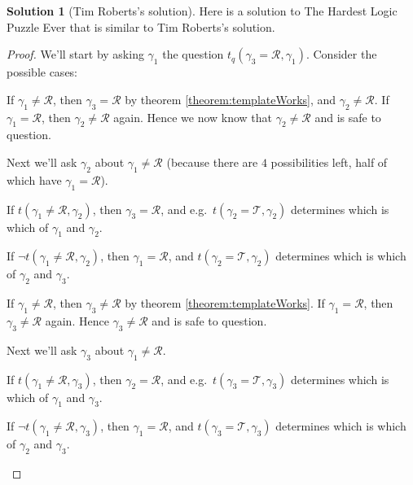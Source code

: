 \documentclass[twoside,twocolumn,a4paper,11pt]{article}
\theoremstyle{definition}
\newtheorem{solution}[theorem]{Solution}
\begin{document}
\begin{solution}[Tim Roberts's solution]
\label{solution:nonRPrio}
Here is a solution to The Hardest Logic Puzzle Ever that is similar to Tim Roberts's
solution.\cite{rob01}
\vspace{-0.0em}
\end{solution}
\begin{proof}
We'll start by asking $\gamma_1$ the question $t_q(\gamma_3=\mathcal{R},\gamma_1)$.
Consider the possible cases:

\begin{description}[itemsep=0pt,topsep=1pt,leftmargin=1.1em]
\item[Case \(t(\gamma_3=\mathcal{R},\gamma_1)\):] \hspace{0.0em}If $\gamma_1\neq\mathcal{R}$,
 then $\gamma_3=\mathcal{R}$ by theorem \ref{theorem:templateWorks}, and 
 $\gamma_2\neq\mathcal{R}$.
 If $\gamma_1=\mathcal{R}$,
 then $\gamma_2\neq\mathcal{R}$ again. Hence we now know that $\gamma_2\neq\mathcal{R}$ and 
 is safe to question.
 
 Next we'll ask $\gamma_2$ about $\gamma_1\neq\mathcal{R}$ (because there are $4$ 
 possibilities left, half of which have $\gamma_1=\mathcal{R}$).
 
 If \(t(\gamma_1\neq\mathcal{R},\gamma_2)\), then $\gamma_3=\mathcal{R}$,  
 and e.g.\ $t(\gamma_2=\mathcal{T},\gamma_2)$ determines which is which of $\gamma_1$ and 
 $\gamma_2$. 

 If \(\neg t(\gamma_1\neq\mathcal{R},\gamma_2)\), 
 then $\gamma_1=\mathcal{R}$, and 
 $t(\gamma_2=\mathcal{T},\gamma_2)$ determines which is which of $\gamma_2$ and $\gamma_3$.

\item[Case \(\neg t(\gamma_3=\mathcal{R},\gamma_1)\):] \hspace{0.0em}If 
$\gamma_1\neq\mathcal{R}$,
 then $\gamma_3\neq\mathcal{R}$ by theorem \ref{theorem:templateWorks}.
 If $\gamma_1=\mathcal{R}$,
 then $\gamma_3\neq\mathcal{R}$ again. Hence $\gamma_3\neq\mathcal{R}$ and is safe to question.
 
 Next we'll ask $\gamma_3$ about $\gamma_1\neq\mathcal{R}$.

 If \(t(\gamma_1\neq\mathcal{R},\gamma_3)\), then $\gamma_2=\mathcal{R}$,  
 and e.g.\ $t(\gamma_3=\mathcal{T},\gamma_3)$ determines which is which of $\gamma_1$ and 
 $\gamma_3$. 

 If \(\neg t(\gamma_1\neq\mathcal{R},\gamma_3)\), 
 then $\gamma_1=\mathcal{R}$, and 
 $t(\gamma_3=\mathcal{T},\gamma_3)$ determines which is which of $\gamma_2$ and $\gamma_3$.
\end{description}
\vspace{-1.35em}
\end{proof}
\end{document}
